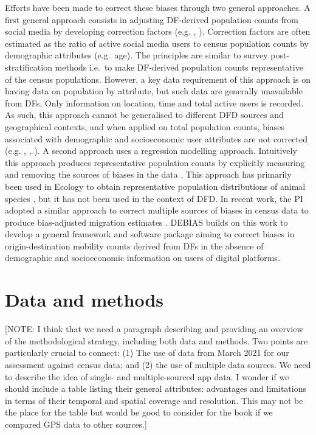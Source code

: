 \documentclass[]{rsos}%
\begin{document}
Efforts have been made to correct these biases through two general
approaches. A first general approach consists in adjusting DF-derived
population counts from social media by developing correction factors
(e.g. \citep{yildiz17-twitter}, \citep{Hsiao24-bias}). Correction factors are
often estimated as the ratio of active social media users to census
population counts by demographic attributes (e.g.~age). The principles
are similar to survey post-stratification methods i.e.~to make
DF-derived population counts representative of the census populations.
However, a key data requirement of this approach is on having data on
population by attribute, but such data are generally unavailable from
DFs. Only information on location, time and total active users is
recorded. As such, this approach cannot be generalised to different DFD
sources and geographical contexts, and when applied on total population
counts, biases associated with demographic and socioeconomic user
attributes are not corrected (e.g. \citep{rodriguez-carrion18-biases},
\citep{schlosser21-biases}, \citep{pak22-correcting-bias}). A second approach uses
a regression modelling approach. Intuitively this approach produces
representative population counts by explicitly measuring and removing
the sources of biases in the data \citep{kramer-schadt13-bias-correction}.
This approach has primarily been used in Ecology to obtain
representative population distributions of animal species
\citep{zizka21-sampbias}, but it has not been used in the context of DFD. In
recent work, the PI adopted a similar approach to correct multiple
sources of biases in census data to produce bias-adjusted migration
estimates \citep{aparicio-castro23-bayesian}. DEBIAS builds on this work to
develop a general framework and software package aiming to correct
biases in origin-destination mobility counts derived from DFs in the
absence of demographic and socioeconomic information on users of digital
platforms.

\section{Data and methods}\label{data-and-methods}

{[}NOTE: I think that we need a paragraph describing and providing an
overview of the methodological strategy, including both data and
methods. Two points are particularly crucial to connect: (1) The use of
data from March 2021 for our assessment against census data; and (2) the
use of multiple data sources. We need to describe the idea of single-
and multiple-sourced app data. I wonder if we should include a table
listing their general attributes: advantages and limitations in terms of
their temporal and spatial coverage and resolution. This may not be the
place for the table but would be good to consider for the book if we
compared GPS data to other sources.{]}
\end{document}
